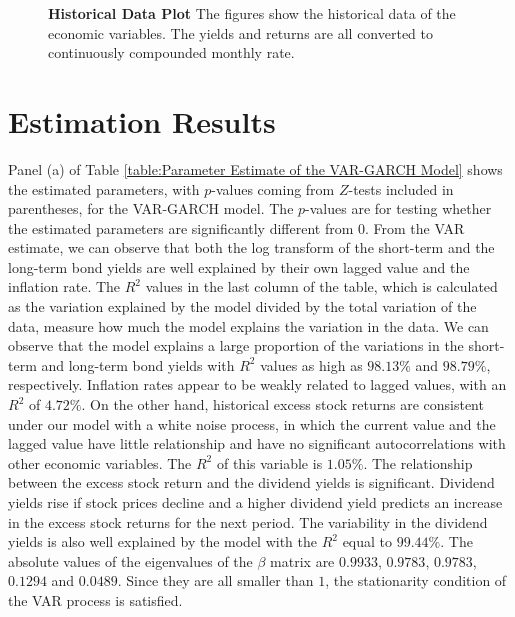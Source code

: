 \documentclass{sfuthesis}
\numberwithin{equation}{chapter}
\begin{document}
\begin{figure}[h]
\begin{subfigure}[t]{0.8\textwidth}
			\end{subfigure}
			\caption[Historical Data Plot]{\textbf{Historical Data Plot} \newline\footnotesize \justify The figures show the historical data of the economic variables. The yields and returns are all converted to continuously compounded monthly rate.}
			\label{fig:Historical Data Plot}
		\end{figure}
		
	
	
	\section{Estimation Results}
	\label{Estimation Results}
	
		\justify
		Panel (a) of Table \ref{table:Parameter Estimate of the VAR-GARCH Model} shows the estimated parameters, with $p$-values coming from $Z$-tests included in parentheses, for the VAR-GARCH model. The $p$-values are for testing whether the estimated parameters are significantly different from $0$. From the VAR estimate, we can observe that both the log transform of the short-term and the long-term bond yields are well explained by their own lagged value and the inflation rate. The $R^2$ values in the last column of the table, which is calculated as the variation explained by the model divided by the total variation of the data, measure how much the model explains the variation in the data. We can observe that the model explains a large proportion of the variations in the short-term and long-term bond yields with $R^2$ values as high as $98.13\%$ and $98.79\%$, respectively. Inflation rates appear to be weakly related to lagged values, with an $R^2$ of $4.72\%$. On the other hand, historical excess stock returns are consistent under our model with a white noise process, in which the current value and the lagged value have little relationship and have no significant autocorrelations with other economic variables. The $R^2$ of this variable is $1.05\%$. The relationship between the excess stock return and the dividend yields is significant. Dividend yields rise if stock prices decline and a higher dividend yield predicts an increase in the excess stock returns for the next period. The variability in the dividend yields is also well explained by the model with the $R^2$ equal to $99.44\%$.  The absolute values of the eigenvalues of the $\beta$ matrix are $0.9933$, $0.9783$, $0.9783$, $0.1294$ and $0.0489$. Since they are all smaller than $1$, the stationarity condition of the VAR process is satisfied.
\end{document}

